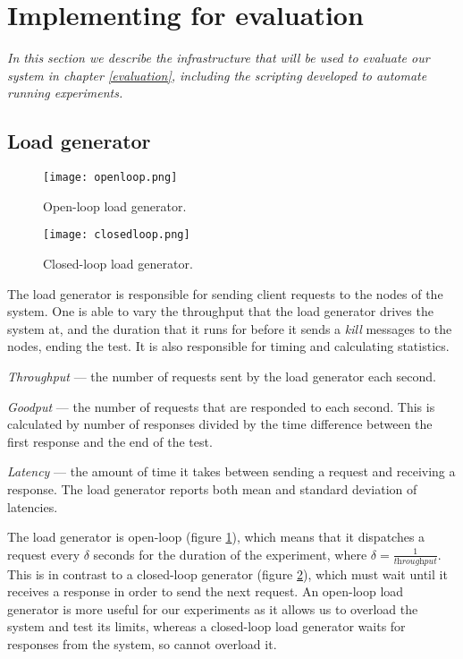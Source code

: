 \section{Implementing for evaluation} \label{benchcode}

\textit{In this section we describe the infrastructure that will be used to evaluate our system in chapter \ref{evaluation}, including the scripting developed to automate running experiments.}

\subsection{Load generator} \label{loadgenerator}

\begin{figure}[h]
\centering
\texttt{[image: openloop.png]}
\caption{Open-loop load generator.}
\label{openloop}
\end{figure}

\begin{figure}[h]
\centering
\texttt{[image: closedloop.png]}
\caption{Closed-loop load generator.}
\label{closedloop}
\end{figure}

The load generator is responsible for sending client requests to the nodes of the system. One is able to vary the throughput that the load generator drives the system at, and the duration that it runs for before it sends a \textit{kill} messages to the nodes, ending the test. It is also responsible for timing and calculating statistics.

\begin{description}
	\item \textit{Throughput} --- the number of requests sent by the load generator each second.
	\item \textit{Goodput} --- the number of requests that are responded to each second. This is calculated by number of responses divided by the time difference between the first response and the end of the test.
	\item \textit{Latency} --- the amount of time it takes between sending a request and receiving a response. The load generator reports both mean and standard deviation of latencies.
\end{description}

The load generator is open-loop (figure \ref{openloop}), which means that it dispatches a request every $\delta$ seconds for the duration of the experiment, where $\delta = \frac{1}{\textit{throughput}}$. This is in contrast to a closed-loop generator (figure \ref{closedloop}), which must wait until it receives a response in order to send the next request. An open-loop load generator is more useful for our experiments as it allows us to overload the system and test its limits, whereas a closed-loop load generator waits for responses from the system, so cannot overload it.

